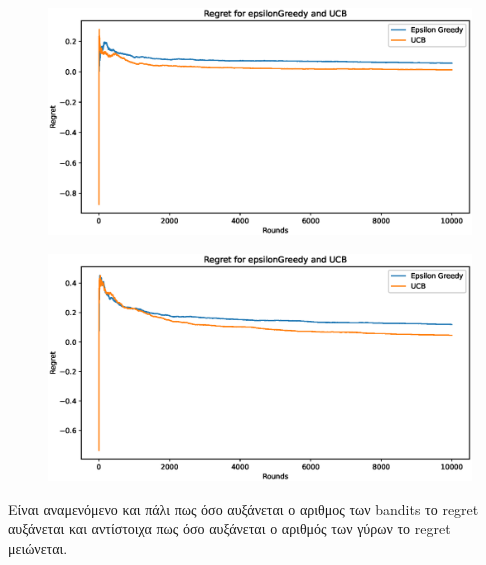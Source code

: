 \begin{figure}[h]
	\centering
	\begin{minipage}{.4\textwidth}
		\centering
		\includegraphics[width=0.9\linewidth]{Images/Regret5_10000.eps}
		\label{fig:epsilon_10001}
	\end{minipage}
	\begin{minipage}{.4\textwidth}
		\centering
		\includegraphics[width=0.9\linewidth]{Images/Regret20_10000.eps}
		\label{fig:epsilon_15000}
	\end{minipage}
\end{figure}

\noindent
Είναι αναμενόμενο και πάλι πως όσο αυξάνεται ο αριθμος των bandits το regret αυξάνεται και αντίστοιχα πως όσο αυξάνεται ο αριθμός των γύρων το regret μειώνεται.